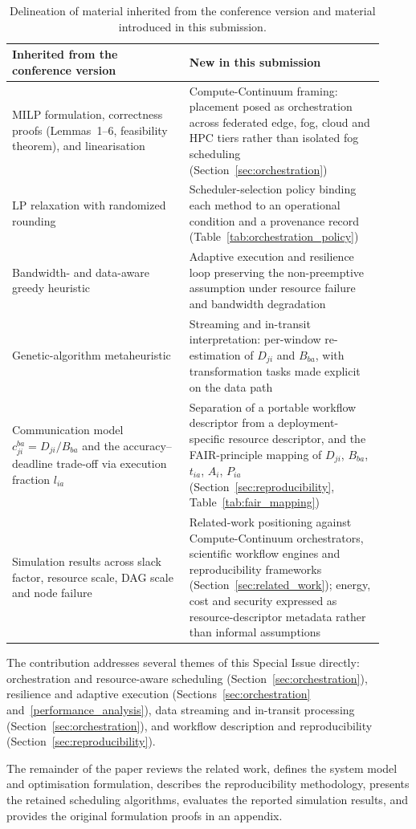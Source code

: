 \begin{table}[t]
\centering
\caption{Delineation of material inherited from the conference version and material introduced in
this submission.}
\label{tab:novelty}
\small
\begin{tabular}{p{0.44\linewidth}p{0.48\linewidth}}
\toprule
\textbf{Inherited from the conference version} & \textbf{New in this submission} \\
\midrule
MILP formulation, correctness proofs (Lemmas~1--6, feasibility theorem), and linearisation &
Compute-Continuum framing: placement posed as orchestration across federated edge, fog, cloud and
HPC tiers rather than isolated fog scheduling (Section~\ref{sec:orchestration}) \\
\addlinespace
LP relaxation with randomized rounding &
Scheduler-selection policy binding each method to an operational condition and a provenance record
(Table~\ref{tab:orchestration_policy}) \\
\addlinespace
Bandwidth- and data-aware greedy heuristic &
Adaptive execution and resilience loop preserving the non-preemptive assumption under resource
failure and bandwidth degradation \\
\addlinespace
Genetic-algorithm metaheuristic &
Streaming and in-transit interpretation: per-window re-estimation of $D_{ji}$ and $B_{ba}$, with
transformation tasks made explicit on the data path \\
\addlinespace
Communication model $c_{ji}^{ba}=D_{ji}/B_{ba}$ and the accuracy--deadline trade-off via execution
fraction $l_{ia}$ &
Separation of a portable workflow descriptor from a deployment-specific resource descriptor, and
the FAIR-principle mapping of $D_{ji}$, $B_{ba}$, $t_{ia}$, $A_i$, $P_{ia}$
(Section~\ref{sec:reproducibility}, Table~\ref{tab:fair_mapping}) \\
\addlinespace
Simulation results across slack factor, resource scale, DAG scale and node failure &
Related-work positioning against Compute-Continuum orchestrators, scientific workflow engines and
reproducibility frameworks (Section~\ref{sec:related_work}); energy, cost and security expressed as
resource-descriptor metadata rather than informal assumptions \\
\bottomrule
\end{tabular}
\end{table}

The contribution addresses several themes of this Special Issue directly: orchestration and
resource-aware scheduling (Section~\ref{sec:orchestration}), resilience and adaptive execution
(Sections~\ref{sec:orchestration} and~\ref{performance_analysis}), data streaming and in-transit
processing (Section~\ref{sec:orchestration}), and workflow description and reproducibility
(Section~\ref{sec:reproducibility}).

The remainder of the paper reviews the related work, defines the system model and optimisation formulation, describes the reproducibility methodology, presents the retained scheduling algorithms, evaluates the reported simulation results, and provides the original formulation proofs in an appendix.
